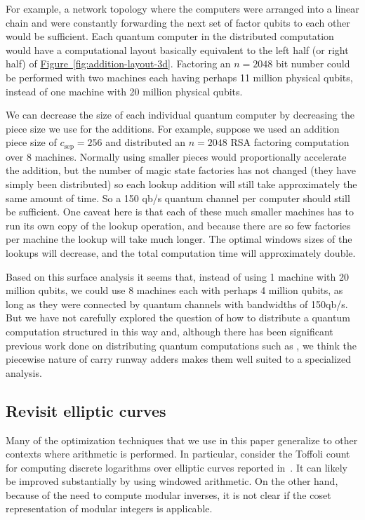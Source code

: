 \documentclass[a4paper, onecolumn, accepted=2021-03-29]{quantumarticle}
\newcommand{\fig}[1]{\hyperref[fig:#1]{Figure~\ref*{fig:#1}}}
\newcommand{\gsep}{{c_{\text{sep}}}}
\begin{document}
For example, a network topology where the computers were arranged into a linear chain and were constantly forwarding the next set of factor qubits to each other would be sufficient.
Each quantum computer in the distributed computation would have a computational layout basically equivalent to the left  half (or right half) of \fig{addition-layout-3d}.
Factoring an $n=2048$ bit number could be performed with two machines each having perhaps 11 million physical qubits, instead of one machine with 20 million physical qubits.

We can decrease the size of each individual quantum computer by decreasing the piece size we use for the additions.
For example, suppose we used an addition piece size of $\gsep=256$ and distributed an $n=2048$ RSA factoring computation over 8 machines.
Normally using smaller pieces would proportionally accelerate the addition, but the number of magic state factories has not changed (they have simply been distributed) so each lookup addition will still take approximately the same amount of time.
So a 150 qb/s quantum channel per computer should still be sufficient.
One caveat here is that each of these much smaller machines has to run its own copy of the lookup operation, and because there are so few factories per machine the lookup will take much longer.
The optimal windows sizes of the lookups will decrease, and the total computation time will approximately double.

Based on this surface analysis it seems that, instead of using 1 machine with 20 million qubits, we could use 8 machines each with perhaps 4 million qubits, as long as they were connected by quantum channels with bandwidths of 150qb/s.
But we have not carefully explored the question of how to distribute a quantum computation structured in this way and, although there has been significant previous work done on distributing quantum computations such as \cite{meter2008arithmetic,oi2006scalable,jiang2010scalable}, we think the piecewise nature of carry runway adders makes them well suited to a specialized analysis.

\subsection{Revisit elliptic curves}
\label{sec:revisit-elliptic-curves}

Many of the optimization techniques that we use in this paper generalize to other contexts where arithmetic is performed.
In particular, consider the Toffoli count for computing discrete logarithms over elliptic curves reported in~\cite{roetteler2017quantum}.
It can likely be improved substantially by using windowed arithmetic.
On the other hand, because of the need to compute modular inverses, it is not clear if the coset representation of modular integers is applicable.
\end{document}
